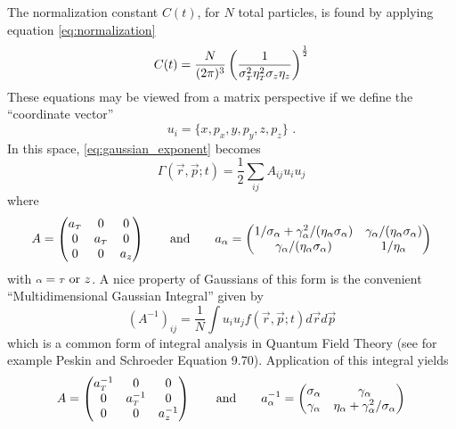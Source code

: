 The normalization constant $C(t)$, for $N$ total particles, is found by applying equation \ref{eq:normalization}
\begin{equation}
  C(t) = \frac{N}{(2\pi)^3} 
  \left( 
    \frac{1}{\sigma_{{\scriptscriptstyle T}}^2\eta_{{\scriptscriptstyle T}}^2\sigma_{z}\eta_{z}}
  \right)^{\frac{1}{2}}
\end{equation}
These equations may be viewed from a matrix perspective if we define the ``coordinate vector''
\begin{equation} \label{eq:coordinate_vector}
u_i = \{x, p_x, y, p_y, z, p_z\}\text{ .}
\end{equation}
In this space, \ref{eq:gaussian_exponent} becomes
\begin{equation}
  \Gamma(\vec{r}, \vec{p}; t) = \frac{1}{2}\sum\limits_{ij} A_{ij} u_i u_j
\end{equation}
where
\begin{equation}
  A = 
  \begin{pmatrix}
    a_{{\scriptscriptstyle T}} & 0 & 0 \\
    0 & a_{{\scriptscriptstyle T}} & 0 \\
    0 & 0 & a_{z}
  \end{pmatrix}
  \qquad \text{and} \qquad
  a_{\alpha} = 
  \begin{pmatrix}
    1/\sigma_{\alpha} + \gamma_{\alpha}^2/(\eta_{\alpha} \sigma_{\alpha}) & \gamma_{\alpha}/(\eta_{\alpha} \sigma_{\alpha}) \\
    \gamma_{\alpha}/(\eta_{\alpha} \sigma_{\alpha}) & 1/\eta_{\alpha}
  \end{pmatrix}
\end{equation}
with ${\scriptstyle \alpha} = {\scriptscriptstyle T} \text{ or } z$. 
A nice property of Gaussians of this form is the convenient ``Multidimensional Gaussian Integral'' given by
\begin{equation} \label{eq:gaussian_integral}
  (A^{-1})_{ij} = \frac{1}{N} \int u_i u_j f(\vec{r}, \vec{p}; t) d\vec{r} d\vec{p}
\end{equation}
which is a common form of integral analysis in Quantum Field Theory (see for example Peskin and Schroeder Equation 9.70). 
Application of this integral yields
\begin{equation}
  A = 
  \begin{pmatrix}
    a_{{\scriptscriptstyle T}}^{-1} & 0 & 0 \\
    0 & a_{{\scriptscriptstyle T}}^{-1} & 0 \\
    0 & 0 & a_{z}^{-1}
  \end{pmatrix}
  \qquad \text{and} \qquad
  a^{-1}_{\alpha} = 
  \begin{pmatrix}
    \sigma_{\alpha} & \gamma_{\alpha} \\
    \gamma_{\alpha} & \eta_{\alpha} + \gamma_{\alpha}^2/\sigma_{\alpha}
  \end{pmatrix}
\end{equation}

